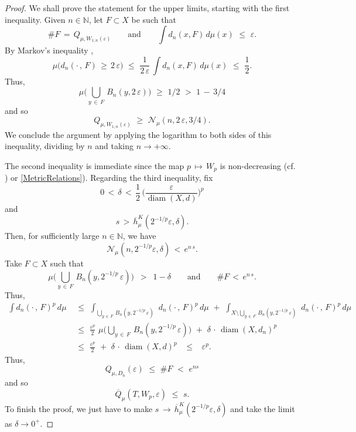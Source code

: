 \documentclass[11pt,a4paper,reqno]{amsart}
\theoremstyle{plain}
\theoremstyle{definition}
\newcommand{\field}[1]{\mathbb{#1}}
\newcommand{\NN}{\field{N}}
\newcommand{\ep} {\varepsilon}
\newcommand{\vep}{\varepsilon}
\newcommand{\cN}{{\mathcal N}}
\newcommand{\diam}{\operatorname{{diam}}}
\begin{document}
\begin{proof} We shall prove the statement for the upper limits, starting with the first inequality. Given $n\in\NN$, let $F\subset X$ be such that  
$$\#F\,=\,Q_{\mu,W_{1,n}(\ep)}
\qquad\text{and}\qquad\int   d_n(x,F)\,d \mu(x)\,\,\leq\,\,\ep.$$
By Markov's inequality %
,
$$\mu\Big(d_n(\cdot\,,\,F)\,\geq\,2\,\ep \Big)\,\,\leq\,\,\frac{1}{2\,\ep}\,\int   d_n(x,F)\,d \mu(x)\,\,\leq\,\,\frac{1}{2}.$$ Thus,
$$\mu\Big(\bigcup_{y\,\in\,F} \, B_n(y,2\,\ep) \Big)
\,\,\geq\,\, 1/2\,\,>\,\,1\,-\,3/4$$
and so
$$Q_{\mu,W_{1,n}(\ep)}\,\,\geq\,\, \mathcal{N}_\mu(n,2\,\vep, 3/4).$$
We conclude the argument by applying the logarithm to both sides of this inequality, dividing by $n$ and taking $n \to +\infty.$ 
\smallskip

The second inequality is immediate since the map $p\,\mapsto\,W_p$ is non-decreasing (cf. \cite[p.~210]{Vi}) or \eqref{MetricRelations}). Regarding the third inequality, fix 
$$0 \,<\,\delta\,<\,\frac{1}{2}\,\Big(\frac{\ep}{\diam(X,d)}\Big)^p$$ and 
$$ s\,>\,\overline{h}^K_\mu(2^{-1/p}\ep, \delta).$$
Then, for sufficiently large $n\in\NN$, we have $$\cN_\mu(n,2^{-1/p}\ep, \delta)\,<\,e^{n\,s}.$$
Take $F\subset X$ such that 
$$\mu\Big( \bigcup_{y\,\in\,F} \, B_n(y,2^{-1/p}\,\ep) \Big)\,\,\,>\,\,\, 1-\delta\qquad\text{and}\qquad \#F\,<\,e^{n\,s}.$$ 
Thus, 
\begin{align*}
\int   d_n(\cdot\,,\,F)^p\,d \mu \,\,&\leq\,\,\int_{\displaystyle \bigcup_{y\,\in\,F} \, B_n(y,2^{-1/p}\,\ep)} \,\,  d_n(\cdot\,,\,F)^p\,d \mu\,\,+\,\,\int_{\displaystyle X \setminus \bigcup_{y\,\in\,F} \, B_n(y,2^{-1/p}\,\ep)}\,\,    d_n(\cdot\,,\,F)^p\,d \mu \\
&\leq \,\, \frac{\ep^p}{2}\,\,\mu\Big( \bigcup_{y\,\in\,F} \, B_n(y,2^{-1/p}\,\ep) \Big)\,\,+\,\, \delta \,\cdot\, \diam(X,d_n)^p\\ 
&\leq \,\, \frac{\ep^p}{2}\,\,+\,\, \delta \, \cdot \, \diam(X,d)^p\,\,\,\,\,\leq\,\,\,\,\, \ep^p.
\end{align*}
Thus, 
$$Q_{\mu,D_n}(\ep)\,\,\leq\,\,\#F\,\,<\,\, e^{ns}$$
and so 
$$\overline{Q}_\mu(T,W_p,\ep)\,\,\leq\,\,s.$$
To finish the proof, we just have to make  $s\,\to\,\overline{h}^K_\mu(2^{-1/p}\ep, \delta)$ and take the limit as $\delta\to 0^+$.
\end{proof}
\end{document}
